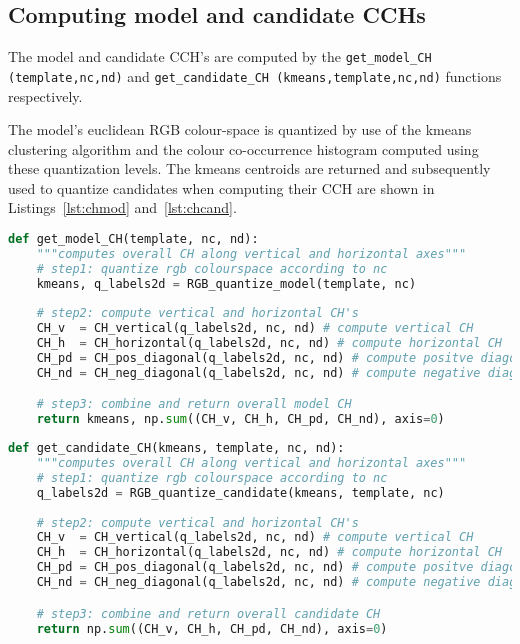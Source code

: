 \subsection{Computing model and candidate CCHs}
The model and candidate CCH's are computed by the \lstinline{get_model_CH (template,nc,nd)} 
and \lstinline{get_candidate_CH (kmeans,template,nc,nd)}
functions respectively.

The model's euclidean RGB colour-space is quantized by use of the kmeans
clustering algorithm and the colour co-occurrence histogram computed using these
quantization levels. The kmeans centroids are returned and subsequently used to
quantize candidates when computing their CCH are shown in
Listings~\ref{lst:chmod} and~\ref{lst:chcand}.

\begin{lstlisting}[language=Python, caption={Computing model CH}, captionpos=b, label={lst:chmod}]
def get_model_CH(template, nc, nd):
    """computes overall CH along vertical and horizontal axes"""
    # step1: quantize rgb colourspace according to nc
    kmeans, q_labels2d = RGB_quantize_model(template, nc)
    
    # step2: compute vertical and horizontal CH's
    CH_v  = CH_vertical(q_labels2d, nc, nd) # compute vertical CH
    CH_h  = CH_horizontal(q_labels2d, nc, nd) # compute horizontal CH
    CH_pd = CH_pos_diagonal(q_labels2d, nc, nd) # compute positve diagonal CH
    CH_nd = CH_neg_diagonal(q_labels2d, nc, nd) # compute negative diagonal CH

    # step3: combine and return overall model CH
    return kmeans, np.sum((CH_v, CH_h, CH_pd, CH_nd), axis=0)
\end{lstlisting}

\begin{lstlisting}[language=Python, caption={Computing candidate CH}, captionpos=b, label={lst:chcand}]
def get_candidate_CH(kmeans, template, nc, nd):
    """computes overall CH along vertical and horizontal axes"""
    # step1: quantize rgb colourspace according to nc
    q_labels2d = RGB_quantize_candidate(kmeans, template, nc)
    
    # step2: compute vertical and horizontal CH's
    CH_v  = CH_vertical(q_labels2d, nc, nd) # compute vertical CH
    CH_h  = CH_horizontal(q_labels2d, nc, nd) # compute horizontal CH
    CH_pd = CH_pos_diagonal(q_labels2d, nc, nd) # compute positve diagonal CH
    CH_nd = CH_neg_diagonal(q_labels2d, nc, nd) # compute negative diagonal CH

    # step3: combine and return overall candidate CH
    return np.sum((CH_v, CH_h, CH_pd, CH_nd), axis=0)
\end{lstlisting}

